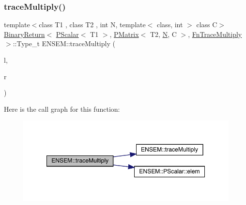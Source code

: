 \subsubsection{\texorpdfstring{traceMultiply()}{traceMultiply()}\hspace{0.1cm}{\footnotesize\ttfamily [3/3]}}
{\footnotesize\ttfamily template$<$class T1 , class T2 , int N, template$<$ class, int $>$ class C$>$ \\
\mbox{\hyperlink{structENSEM_1_1BinaryReturn}{Binary\+Return}}$<$ \mbox{\hyperlink{classENSEM_1_1PScalar}{P\+Scalar}}$<$ T1 $>$, \mbox{\hyperlink{classENSEM_1_1PMatrix}{P\+Matrix}}$<$ T2, \mbox{\hyperlink{adat__devel_2lib_2hadron_2operator__name__util_8cc_a7722c8ecbb62d99aee7ce68b1752f337}{N}}, C $>$, \mbox{\hyperlink{structENSEM_1_1FnTraceMultiply}{Fn\+Trace\+Multiply}} $>$\+::Type\+\_\+t E\+N\+S\+E\+M\+::trace\+Multiply (\begin{DoxyParamCaption}\item[{const \mbox{\hyperlink{classENSEM_1_1PScalar}{P\+Scalar}}$<$ T1 $>$ \&}]{l,  }\item[{const \mbox{\hyperlink{classENSEM_1_1PMatrix}{P\+Matrix}}$<$ T2, \mbox{\hyperlink{adat__devel_2lib_2hadron_2operator__name__util_8cc_a7722c8ecbb62d99aee7ce68b1752f337}{N}}, C $>$ \&}]{r }\end{DoxyParamCaption})\hspace{0.3cm}{\ttfamily [inline]}}

Here is the call graph for this function\+:\nopagebreak
\begin{figure}[H]
\begin{center}
\leavevmode
\includegraphics[width=349pt]{df/d0a/group__primmatrix_ga5b0cf4c87cad1bfd7dcad0a42d0b4ae6_cgraph}
\end{center}
\end{figure}
\mbox{\label{group__primmatrix_gaaf91f3c1c18cadfc208acd80fd80ab0b}} 
